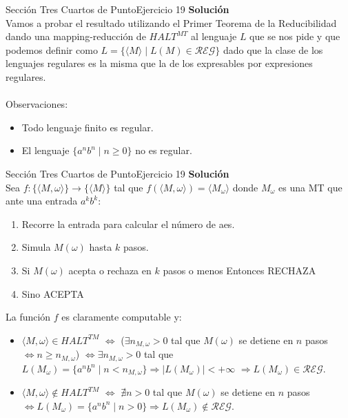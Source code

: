 \documentclass[10pt, envcountsect, presentation, aspectratio=169]{beamer}
\begin{document}
\begin{frame}{Sección Tres Cuartos de Punto}{Ejercicio 19}
    \textbf{Solución}\\
    Vamos a probar el resultado utilizando el Primer Teorema de la Reducibilidad dando una mapping-reducción de $HALT^{MT}$ al lenguaje $L$ que se nos pide y que podemos definir como $L = \{\langle M \rangle \mid L(M) \in \mathcal{REG}\}$ dado que la clase de los lenguajes regulares es la misma que la de los expresables por expresiones regulares.\\~\\

    Observaciones:
    \begin{itemize}
        \item Todo lenguaje finito es regular.
        \item El lenguaje $\{a^n b^n \mid n \geq 0\}$ no es regular.
    \end{itemize}
\end{frame}


\begin{frame}{Sección Tres Cuartos de Punto}{Ejercicio 19}
    \textbf{Solución}\\
    Sea $f: \{\langle M, \omega \rangle\} \rightarrow \{\langle M \rangle \}$ tal que $f(\langle M, \omega \rangle) = \langle M_{\omega} \rangle$ donde $M_{\omega}$ es una MT que ante una entrada $a^k b^k$:
    \begin{enumerate}
    \item Recorre la entrada para calcular el número de aes.
    \item Simula $M(\omega)$ hasta $k$ pasos.
    \item Si $M(\omega)$ acepta o rechaza en $k$ pasos o menos Entonces RECHAZA
    \item Sino ACEPTA
    \end{enumerate}
    La función $f$ es claramente computable y:
    \begin{itemize}
    \item $\langle M, \omega \rangle \in HALT^{TM}$ $\Leftrightarrow$  ($\exists n_{M,\omega} > 0$ tal que $M(\omega)$ se detiene en $n$ pasos $\Leftrightarrow n \geq n_{M,\omega}$) $\Leftrightarrow \exists n_{M,\omega} > 0$ tal que $L(M_{\omega}) = \{a^n b^n \mid n < n_{M,\omega}\} \Rightarrow |L(M_{\omega})| < + \infty$ $\Rightarrow L(M_{\omega}) \in \mathcal{REG}$.
    \item $\langle M, \omega \rangle \notin HALT^{TM}$ $\Leftrightarrow$  $\nexists n > 0$ tal que $M(\omega)$ se detiene en $n$ pasos $\Leftrightarrow L(M_{\omega}) = \{a^n b^n \mid n > 0\} \Rightarrow L(M_{\omega}) \notin \mathcal{REG}$.
    \end{itemize}
\end{frame}
\end{document}
